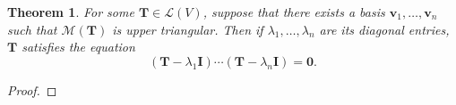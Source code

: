 \documentclass[11pt]{article}
\renewcommand{\vec}[1]{\mathbf{#1}}
\newcommand{\mat}[1]{\mathbf{#1}}
\newtheorem{theorem}{Theorem}
\begin{document}
\begin{theorem}
	For some $\mat{T} \in \mathcal{L}(V)$, suppose that there exists a basis $\vec{v}_{1}, \ldots, \vec{v}_{n}$ such that $\mathcal{M}(\mat{T})$ is upper triangular. Then if $\lambda_{1}, \ldots, \lambda_{n}$ are its diagonal entries, $\mat{T}$ satisfies the equation
	\[
		(\mat{T} - \lambda_{1} \mat{I}) \cdots (\mat{T} - \lambda_{n} \vec{I}) = \mat{0}.
	\]
\end{theorem}
\begin{adjustwidth}{1cm}{}
	\begin{proof}
		
	\end{proof}
\end{adjustwidth}

\end{document}
